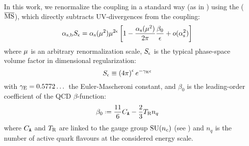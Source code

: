 In this work, we renormalize the coupling in a standard way (as in \cite{Catani-1998}) using the  ($ \overline{\text{MS}} $), which directly subtracts UV-divergences from the coupling:
\begin{equation}
  \alpha_\text{s,b} S_\epsilon = \alpha_\text{s}(\mu^2) \mu^{2\epsilon} \left[ 1 - \frac{\alpha_\text{s}(\mu^2)}{2\pi} \frac{\beta_0}{\epsilon} + o(\alpha_\text{s}^2) \right]
  \label{eq:msb-def}
\end{equation}
where $ \mu $ is an arbitrary renormalization scale, $ S_\epsilon $ is the typical phase-space volume factor in dimensional regularization:
\begin{equation}
  S_\epsilon \equiv \left( 4\pi \right)^\epsilon e^{-\gamma_\text{E} \epsilon}
\end{equation}
with $ \gamma_\text{E} = 0.5772\dots $ the Euler-Mascheroni constant, and $ \beta_0 $ is the leading-order coefficient of the QCD $ \beta $-function:
\begin{equation}
  \beta_0 \defeq \frac{11}{6} \caa - \frac{2}{3} \ttr n_q
\end{equation}
where $ C_\mathtt{A} $ and $ T_\text{R} $ are linked to the gauge group $ \mathrm{SU}(n_c) $ (see )  and $ n_q $ is the number of active quark flavours at the considered energy scale\footnotemark.


